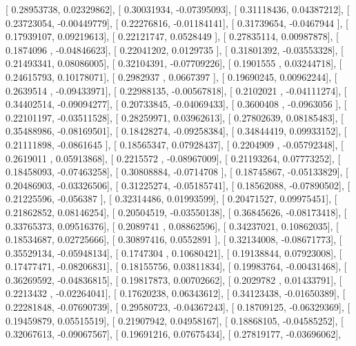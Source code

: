 \documentclass{article}
\begin{document}
       [ 0.28953738,  0.02329862],
       [ 0.30031934, -0.07395093],
       [ 0.31118436,  0.04387212],
       [ 0.23723054, -0.00449779],
       [ 0.22276816, -0.01184141],
       [ 0.31739654, -0.0467944 ],
       [ 0.17939107,  0.09219613],
       [ 0.22121747,  0.0528449 ],
       [ 0.27835114,  0.00987878],
       [ 0.1874096 , -0.04846623],
       [ 0.22041202,  0.0129735 ],
       [ 0.31801392, -0.03553328],
       [ 0.21493341,  0.08086005],
       [ 0.32104391, -0.07709226],
       [ 0.1901555 ,  0.03244718],
       [ 0.24615793,  0.10178071],
       [ 0.2982937 ,  0.0667397 ],
       [ 0.19690245,  0.00962244],
       [ 0.2639514 , -0.09433971],
       [ 0.22988135, -0.00567818],
       [ 0.2102021 , -0.04111274],
       [ 0.34402514, -0.09094277],
       [ 0.20733845, -0.04069433],
       [ 0.3600408 , -0.0963056 ],
       [ 0.22101197, -0.03511528],
       [ 0.28259971,  0.03962613],
       [ 0.27802639,  0.08185483],
       [ 0.35488986, -0.08169501],
       [ 0.18428274, -0.09258384],
       [ 0.34844419,  0.09933152],
       [ 0.21111898, -0.0861645 ],
       [ 0.18565347,  0.07928437],
       [ 0.2204909 , -0.05792348],
       [ 0.2619011 ,  0.05913868],
       [ 0.2215572 , -0.08967009],
       [ 0.21193264,  0.07773252],
       [ 0.18458093, -0.07463258],
       [ 0.30808884, -0.0714708 ],
       [ 0.18745867, -0.05133829],
       [ 0.20486903, -0.03326506],
       [ 0.31225274, -0.05185741],
       [ 0.18562088, -0.07890502],
       [ 0.21225596, -0.056387  ],
       [ 0.32314486,  0.01993599],
       [ 0.20471527,  0.09975451],
       [ 0.21862852,  0.08146254],
       [ 0.20504519, -0.03550138],
       [ 0.36845626, -0.08173418],
       [ 0.33765373,  0.09516376],
       [ 0.2089741 ,  0.08862596],
       [ 0.34237021,  0.10862035],
       [ 0.18534687,  0.02725666],
       [ 0.30897416,  0.0552891 ],
       [ 0.32134008, -0.08671773],
       [ 0.35529134, -0.05948134],
       [ 0.1747304 ,  0.10680421],
       [ 0.19138844,  0.07923008],
       [ 0.17477471, -0.08206831],
       [ 0.18155756,  0.03811834],
       [ 0.19983764, -0.00431468],
       [ 0.36269592, -0.04836815],
       [ 0.19817873,  0.00702662],
       [ 0.2029782 ,  0.01433791],
       [ 0.2213432 , -0.02264041],
       [ 0.17620238,  0.06343612],
       [ 0.34123438, -0.01650389],
       [ 0.22281848, -0.07690739],
       [ 0.29580723, -0.04367243],
       [ 0.18709125, -0.06329369],
       [ 0.19459879,  0.05515519],
       [ 0.21907942,  0.04958167],
       [ 0.18868105, -0.04585252],
       [ 0.32067613, -0.09067567],
       [ 0.19691216,  0.07675434],
       [ 0.27819177, -0.03696062],
\end{document}
